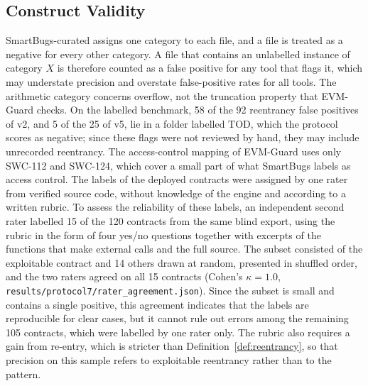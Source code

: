 \documentclass[pdflatex,sn-mathphys]{sn-jnl}
\theoremstyle{thmstyletwo}
\theoremstyle{thmstyletwo}
\begin{document}
\subsection{Construct Validity}\label{sec:threats:construct}
SmartBugs-curated assigns one category to each file, and a file is treated as a negative for every other category. A file that contains an unlabelled instance of category $X$ is therefore counted as a false positive for any tool that flags it, which may understate precision and overstate false-positive rates for all tools. The arithmetic category concerns overflow, not the truncation property that EVM-Guard checks. On the labelled benchmark, 58 of the 92 reentrancy false positives of v2, and 5 of the 25 of v5, lie in a folder labelled TOD, which the protocol scores as negative; since these flags were not reviewed by hand, they may include unrecorded reentrancy. The access-control mapping of EVM-Guard uses only SWC-112 and SWC-124, which cover a small part of what SmartBugs labels as access control. The labels of the deployed contracts were assigned by one rater from verified source code, without knowledge of the engine and according to a written rubric. To assess the reliability of these labels, an independent second rater labelled 15 of the 120 contracts from the same blind export, using the rubric in the form of four yes/no questions together with excerpts of the functions that make external calls and the full source. The subset consisted of the exploitable contract and 14 others drawn at random, presented in shuffled order, and the two raters agreed on all 15 contracts (Cohen's $\kappa = 1.0$, \texttt{results/protocol7/rater\_agreement.json}). Since the subset is small and contains a single positive, this agreement indicates that the labels are reproducible for clear cases, but it cannot rule out errors among the remaining 105 contracts, which were labelled by one rater only. The rubric also requires a gain from re-entry, which is stricter than Definition~\ref{def:reentrancy}, so that precision on this sample refers to exploitable reentrancy rather than to the pattern.
\end{document}
